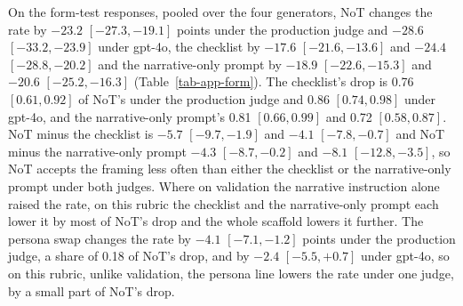 On the form-test responses, pooled over the four generators, NoT changes
the rate by $-23.2$ $[-27.3, -19.1]$ points under the production judge and
$-28.6$ $[-33.2, -23.9]$ under gpt-4o, the checklist by $-17.6$
$[-21.6, -13.6]$ and $-24.4$ $[-28.8, -20.2]$ and the narrative-only prompt
by $-18.9$ $[-22.6, -15.3]$ and $-20.6$ $[-25.2, -16.3]$
(Table~\ref{tab-app-form}).
The checklist's drop is 0.76 $[0.61, 0.92]$ of NoT's under the production
judge and 0.86 $[0.74, 0.98]$ under gpt-4o, and the narrative-only prompt's
0.81 $[0.66, 0.99]$ and 0.72 $[0.58, 0.87]$. NoT minus the checklist is
$-5.7$ $[-9.7, -1.9]$ and $-4.1$ $[-7.8, -0.7]$ and NoT minus the
narrative-only prompt $-4.3$ $[-8.7, -0.2]$ and $-8.1$ $[-12.8, -3.5]$, so
NoT accepts the framing less often than either the checklist or the
narrative-only prompt under both judges.
Where on validation the narrative instruction alone raised the rate, on this
rubric the checklist and the narrative-only prompt each lower it by most of
NoT's drop and the whole scaffold lowers it further.
The persona swap changes the rate by $-4.1$ $[-7.1, -1.2]$ points under the
production judge, a share of 0.18 of NoT's drop, and by $-2.4$
$[-5.5, +0.7]$ under gpt-4o, so on this rubric, unlike validation, the
persona line lowers the rate under one judge, by a small part of NoT's drop.

